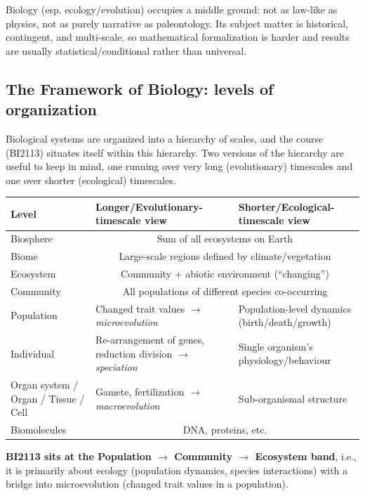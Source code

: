 \documentclass[11pt,a4paper]{article}
\begin{document}
\begin{keybox}
Biology (esp. ecology/evolution) occupies a middle ground: not as law-like as physics, not as purely narrative as paleontology. Its subject matter is historical, contingent, and multi-scale, so mathematical formalization is harder and results are usually statistical/conditional rather than universal.
\end{keybox}

\subsection{The Framework of Biology: levels of organization}
Biological systems are organized into a hierarchy of scales, and the course (BI2113) situates itself within this hierarchy. Two versions of the hierarchy are useful to keep in mind, one running over very long (evolutionary) timescales and one over shorter (ecological) timescales.

\begin{center}
\begin{tabularx}{\textwidth}{@{}l X X@{}}
\toprule
\textbf{Level} & \textbf{Longer/Evolutionary-timescale view} & \textbf{Shorter/Ecological-timescale view} \\
\midrule
Biosphere & \multicolumn{2}{c}{Sum of all ecosystems on Earth} \\
Biome & \multicolumn{2}{c}{Large-scale regions defined by climate/vegetation} \\
Ecosystem & \multicolumn{2}{c}{Community + abiotic environment (``changing'')} \\
Community & \multicolumn{2}{c}{All populations of different species co-occurring} \\
Population & Changed trait values $\to$ \emph{microevolution} & Population-level dynamics (birth/death/growth) \\
Individual & Re-arrangement of genes, reduction division $\to$ \emph{speciation} & Single organism's physiology/behaviour \\
Organ system / Organ / Tissue / Cell & Gamete, fertilization $\to$ \emph{macroevolution} & Sub-organismal structure \\
Biomolecules & \multicolumn{2}{c}{DNA, proteins, etc.} \\
\bottomrule
\end{tabularx}
\end{center}

\textbf{BI2113 sits at the Population $\to$ Community $\to$ Ecosystem band}, i.e., it is primarily about ecology (population dynamics, species interactions) with a bridge into microevolution (changed trait values in a population).
\end{document}
